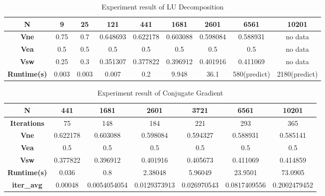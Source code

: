 \documentclass{article}
\begin{document}
\begin{table}[htbp]
	\begin{tabular}{|c|c|c|c|c|c|c|c|c|}
		\hline
		\textbf{N} & 9 & 25 & 121 & 441 & 1681 & 2601 & 6561 & 10201 \\ \hline
		\textbf{Vne} & 0.75 & 0.7 & 0.648693 & 0.622178 & 0.603088 & 0.598084 & 0.588931 & no data \\ \hline
		\textbf{Vea} & 0.5 & 0.5 & 0.5 & 0.5 & 0.5 & 0.5 & 0.5 & no data \\ \hline
		\textbf{Vsw} & 0.25 & 0.3 & 0.351307 & 0.377822 & 0.396912 & 0.401916 & 0.411069 & no data \\ \hline
		\textbf{Runtime(s)} & 0.003 & 0.003 & 0.007 & 0.2 & 9.948 & 36.1 & 580(predict) & 2180(predict) \\ \hline
	\end{tabular}
	\caption{Experiment result of LU Decomposition}
	\label{tab:LU}
\end{table}
\begin{table}[H]
	\begin{tabular}{|c|c|c|c|c|c|c|}
		\hline
		\textbf{N} & 441 & 1681 & 2601 & 3721 & 6561 & 10201 \\ \hline
		\textbf{Iterations} & 75 & 148 & 184 & 221 & 293 & 365 \\ \hline
		\textbf{Vne} & 0.622178 & 0.603088 & 0.598084 & 0.594327 & 0.588931 & 0.585141 \\ \hline
		\textbf{Vea} & 0.5 & 0.5 & 0.5 & 0.5 & 0.5 & 0.5 \\ \hline
		\textbf{Vsw} & 0.377822 & 0.396912 & 0.401916 & 0.405673 & 0.411069 & 0.414859 \\ \hline
		\textbf{Runtime(s)} & 0.036 & 0.8 & 2.38048 & 5.96049 & 23.9501 & 73.0905 \\ \hline
		\textbf{iter\_avg} & 0.00048 & 0.0054054054 & 0.0129373913 & 0.026970543 & 0.0817409556 & 0.2002479452 \\ \hline
	\end{tabular}
	\caption{Experiment result of Conjugate Gradient}
	\label{tab:cg}
\end{table}
\end{document}
